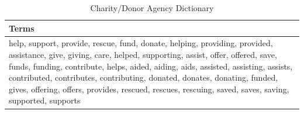 \begin{table}[ht]
\centering
\begin{tabular}{l}
  \hline
Terms \\ 
  \hline
help, support, provide, rescue, fund, donate, helping, providing, provided, assistance, give, giving, care, helped, supporting, assist, offer, offered, save, funds, funding, contribute, helps, aided, aiding, aids, assisted, assisting, assists, contributed, contributes, contributing, donated, donates, donating, funded, gives, offering, offers, provides, rescued, rescues, rescuing, saved, saves, saving, supported, supports \\ 
   \hline
\end{tabular}
\caption{Charity/Donor Agency Dictionary} 
\end{table}
